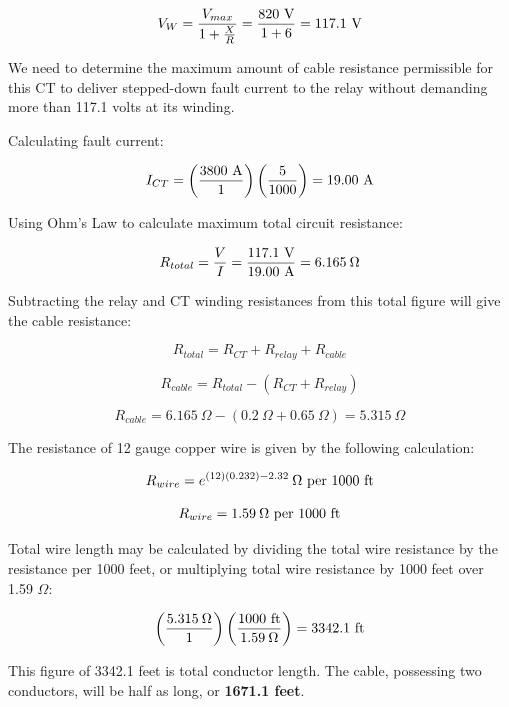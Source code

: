 $$V_W = {V_{max} \over {1 + {X \over R}}} = {820 \hbox{ V} \over {1 + 6}} = 117.1 \hbox{ V}$$

We need to determine the maximum amount of cable resistance permissible for this CT to deliver stepped-down fault current to the relay without demanding more than 117.1 volts at its winding.

\vskip 10pt

Calculating fault current:

$$I_{CT} = \left({3800 \hbox{ A} \over 1} \right) \left({5 \over 1000} \right) = 19.00 \hbox{ A}$$

Using Ohm's Law to calculate maximum total circuit resistance:

$$R_{total} = {V \over I} = {117.1 \hbox{ V} \over 19.00 \hbox{ A}} = 6.165 \> \Omega$$

Subtracting the relay and CT winding resistances from this total figure will give the cable resistance:

$$R_{total} = R_{CT} + R_{relay} + R_{cable}$$

$$R_{cable} = R_{total} - (R_{CT} + R_{relay})$$

$$R_{cable} = 6.165 \> \Omega - (0.2 \> \Omega + 0.65 \> \Omega) = 5.315 \> \Omega$$

The resistance of 12 gauge copper wire is given by the following calculation:

$$R_{wire} = {e^{(12)(0.232) - 2.32}} \> \Omega \hbox{ per 1000 ft}$$

$$R_{wire} = 1.59 \> \Omega \hbox{ per 1000 ft}$$

\filbreak

Total wire length may be calculated by dividing the total wire resistance by the resistance per 1000 feet, or multiplying total wire resistance by 1000 feet over 1.59 $\Omega$:

$$\left({5.315 \> \Omega \over 1}\right) \left({1000 \hbox{ ft} \over 1.59 \> \Omega}\right) = 3342.1 \hbox{ ft}$$

This figure of 3342.1 feet is total conductor length.  The cable, possessing two conductors, will be half as long, or {\bf 1671.1 feet}.




